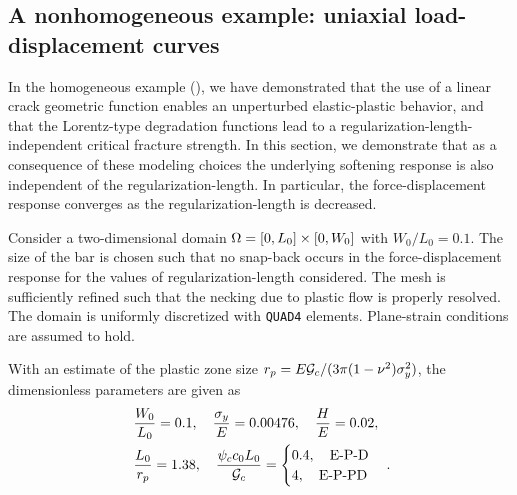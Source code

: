 \subsection{A nonhomogeneous example: uniaxial load-displacement curves}
\label{section: Chapter5/verification/nonhomogeneous}

In the homogeneous example (), we have demonstrated that the use of a linear crack geometric function enables an unperturbed elastic-plastic behavior, and that the Lorentz-type degradation functions lead to a regularization-length-independent critical fracture strength. In this section, we demonstrate that as a consequence of these modeling choices the underlying softening response is also independent of the regularization-length. In particular, the force-displacement response converges as the regularization-length is decreased.



Consider a two-dimensional domain $\Omega = [0, L_0] \times [0, W_0]$ with $W_0 / L_0 = 0.1$. The size of the bar is chosen such that no snap-back occurs in the force-displacement response for the values of regularization-length considered. The mesh is sufficiently refined such that the necking due to plastic flow is properly resolved. The domain is uniformly discretized with \texttt{QUAD4} elements. Plane-strain conditions are assumed to hold.

With an estimate of the plastic zone size $r_p = E{\mathcal{G}_c}/(3 \pi (1-\nu^2) \sigma_y^2)$, the dimensionless parameters are given as
\begin{align*}
   & \ \dfrac{W_0}{L_0} = 0.1, \quad \dfrac{\sigma_y}{E} = 0.00476, \quad \dfrac{H}{E} = 0.02, \\
   & \ \dfrac{L_0}{r_p} = 1.38, \quad \dfrac{\psi_c c_0 L_0}{{\mathcal{G}_c}} =                            
  \begin{cases}
    0.4, \quad \text{E-P-D} \\
    4, \quad \text{E-P-PD}
  \end{cases}.
\end{align*}

